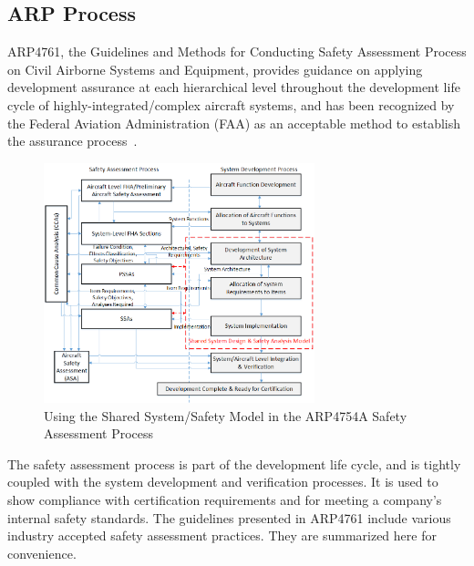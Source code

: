 \subsection{ARP Process}
\label{sec:arpprocess}

ARP4761, the Guidelines and Methods for Conducting Safety Assessment Process on Civil Airborne Systems and Equipment, provides guidance on applying development assurance at each hierarchical level throughout the development life cycle of highly-integrated/complex aircraft systems, and has been recognized by the Federal Aviation Administration (FAA) as an acceptable method to establish the assurance process~\cite{SAE:ARP4761}.

\begin{figure}[h!]
	\centering
	\includegraphics[width=0.7\textwidth]{images/Safety_Assessment_Process.png}
	\caption{Using the Shared System/Safety Model in the ARP4754A Safety Assessment Process}
	\label{fig:proposed_safety_process}
\end{figure}

The safety assessment process is part of the development life cycle, and is tightly coupled with the system development and verification processes. It is used to show compliance with certification requirements and for meeting a company's internal safety standards. The guidelines presented in ARP4761 include various industry accepted safety assessment practices. They are summarized here for convenience. 

